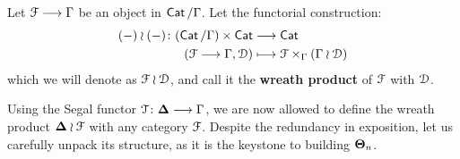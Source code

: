 \begin{definition}\label{ch6:: def: wreath_prod_general}
    Let $\mathcal F \longrightarrow \Gamma$ be an object in $\operatorname{{\sf Cat}}/\Gamma$. Let the functorial construction:
    \begin{align}
    (-)\wr(-) \colon (\operatorname{{\sf Cat}}/\Gamma) \times \operatorname{{\sf Cat}} &\longrightarrow \operatorname{{\sf Cat}} \\
    (\mathcal F \longrightarrow \Gamma, \mathcal D) &\longmapsto \mathcal F \times_{\Gamma} (\Gamma \wr \mathcal D) 
    \end{align} 
    which we will denote as $\mathcal F \wr \mathcal D$, and call it the \textbf{wreath product} of $\mathcal F$ with $\mathcal D$.
\end{definition}

Using the Segal functor $\mathcal T \colon \mathbf\Delta \longrightarrow \Gamma$, we are now allowed to define the wreath product $\mathbf\Delta \wr \mathcal F$ with any category $\mathcal F$. Despite the redundancy in exposition, let us carefully unpack its structure, as it is the keystone to building $\mathbf\Theta_n$.

